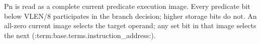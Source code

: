 Pn is read as a complete current predicate execution image. Every predicate
bit below VLEN/8 participates in the branch decision; higher storage bits do
not. An all-zero current image selects the target operand; any set bit in that
image selects the next (:term:base.terms.instruction_address:).
